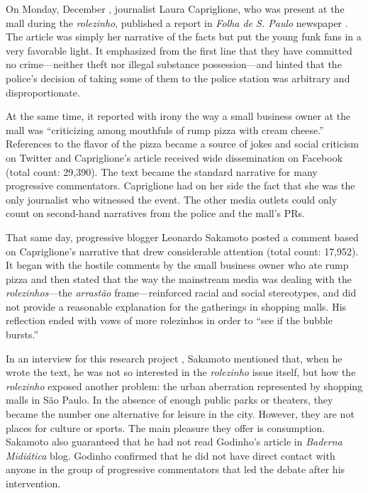 On Monday, December , journalist Laura Capriglione, who was present at the mall during the \emph{rolezinho}, published a report in \emph{Folha de S. Paulo} newspaper \autocite{folha_laura}. The article was simply her narrative of the facts but put the young funk fans in a very favorable light. It emphasized from the first line that they have committed no crime---neither theft nor illegal substance possession---and hinted that the police's decision of taking some of them to the police station was arbitrary and disproportionate.

At the same time, it reported with irony the way a small business owner at the mall was \enquote{criticizing  among mouthfuls of rump pizza with cream cheese.} References to the flavor of the pizza became a source of jokes and social criticism on Twitter \autocite{twitter_picanha_catupiry} and Capriglione's article received wide dissemination on Facebook (total count: 29,390). The text became the standard narrative for many progressive commentators. Capriglione had on her side the fact that she was the only journalist who witnessed the event. The other media outlets could only count on second-hand narratives from the police and the mall's PRs.

That same day, progressive blogger Leonardo Sakamoto posted a comment \autocite{sakamoto_rolezinho} based on Capriglione's narrative that drew considerable attention (total count: 17,952). It began with the hostile comments by the small business owner who ate rump pizza and then stated that the way the mainstream media was dealing with the \emph{rolezinhos}---the \emph{arrastão} frame---reinforced racial and social stereotypes, and did not provide a reasonable explanation for the gatherings in shopping malls. His reflection ended with vows of more rolezinhos in order to \enquote{see if the bubble  bursts.}

In an interview for this research project \autocite{interview_sakamoto}, Sakamoto mentioned that, when he wrote the text, he was not so interested in the \emph{rolezinho} issue itself, but how the \emph{rolezinho} exposed another problem: the urban aberration represented by shopping malls in São Paulo. In the absence of enough public parks or theaters, they became the number one alternative for leisure in the city. However, they are not places for culture or sports. The main pleasure they offer is consumption. Sakamoto also guaranteed that he had not read Godinho's article in \emph{Baderna Midiática} blog. Godinho confirmed that he did not have direct contact with anyone in the group of progressive commentators that led the debate after his intervention.

